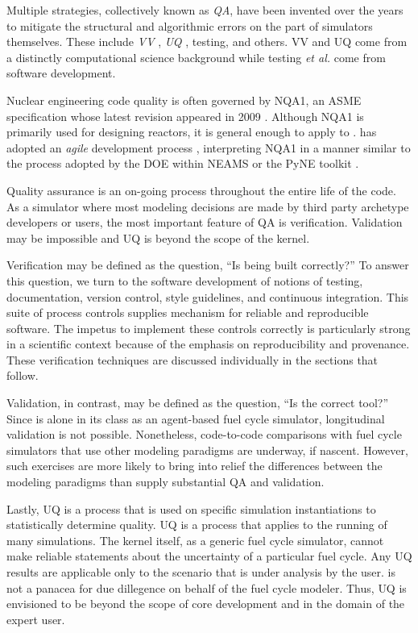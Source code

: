 Multiple strategies, collectively known as \emph{\gls{QA}}, have 
been invented over the years to mitigate the structural and algorithmic errors
on the part of simulators themselves. These include \emph{\gls{VV}}
\cite{boehm_software_1989}, \emph{\gls{UQ}} 
\cite{sacks_design_1989}, testing, and others. \gls{VV} and \gls{UQ} come from 
a distinctly computational science background while testing \emph{et al.} come from software development. 

Nuclear engineering code quality is often governed by \gls{NQA1}, an 
\gls{ASME} specification 
whose latest revision appeared in 2009 \cite{asme_nqa-1a-2009_2009}.  
Although \gls{NQA1} is primarily 
used for designing reactors, it is general enough to apply to 
\Cyclus. \Cyclus has adopted an \emph{agile} development process 
\cite{larman_agile_2004}, 
interpreting \gls{NQA1} in a manner similar to the process adopted by the 
\gls{DOE} within \gls{NEAMS} \cite{neams_nuclear_2013} or the 
PyNE toolkit \cite{biondo_quality_2014}. 

Quality assurance is an on-going process throughout the 
entire life of the code. As a simulator where most modeling decisions are made 
by third party archetype developers or users, the most important feature of 
\gls{QA} is verification. Validation may be impossible and \gls{UQ} is beyond 
the scope of the kernel.

Verification may be defined as the question, ``Is \Cyclus being built correctly?'' 
To answer this question, we turn to the software development of notions of testing,
documentation, version control, style guidelines, and continuous integration. 
This suite of process controls supplies mechanism for reliable and reproducible 
software. The impetus to implement these controls correctly is particularly strong in a scientific 
context because of the emphasis on reproducibility and provenance. These verification techniques are 
discussed individually in the sections that follow.

Validation, in contrast,  may be defined as the question, 
``Is \Cyclus the correct tool?''
Since \Cyclus is alone in its class as an agent-based fuel cycle simulator, longitudinal 
validation is not possible. Nonetheless, code-to-code comparisons with fuel cycle
simulators that use other modeling paradigms are underway, if nascent. However, such 
exercises are more likely to bring into relief the differences between the modeling
paradigms than supply substantial \gls{QA} and validation. 

Lastly, \gls{UQ} is a process that is used on specific simulation
instantiations to statistically determine quality. \gls{UQ} is a process that applies 
to the running of many \Cyclus simulations. The kernel itself, as a generic fuel cycle 
simulator, cannot make reliable statements about the uncertainty of a particular fuel 
cycle. Any \gls{UQ} results are applicable only to the scenario that is under 
analysis by the user. \Cyclus is not a panacea for due dillegence on behalf of the fuel 
cycle modeler. Thus, \gls{UQ} is envisioned to be beyond the scope of core development 
and in the domain of the expert user.

